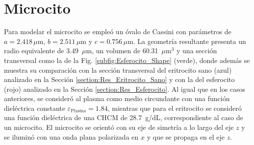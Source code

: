 
\section{Microcito}
\label{section:Res_Microcito}

Para modelar el microcito se empleó un óvalo de Cassini con parámetros de $a=2.418\,\mu\text{m}$, $b=2.511\,\mu\text{m}$ y $c=0.756\,\mu\text{m}$. La geometría resultante presenta un radio equivalente de 3.49~$\mu$m, un volumen de 60.31~$\mu\text{m}^3$ y una sección transversal como la de la Fig. \ref{subfig:Esferocito_Shape} (verde), donde además se muestra su comparación con la sección transversal del eritrocito sano (azul) analizado en la Sección \ref{section:Res_Eritrocito_Sano} y con la del esferocito (rojo) analizado en la Sección \ref{section:Res_Esferocito}. Al igual que en los casos anteriores, se consideró al plasma como medio circundante con una función dieléctrica constante $\varepsilon_{\text{Plasma}}=1.84$, mientras que para el eritrocito se consideró una función dieléctrica de una CHCM de 28.7~g/dL, correspondiente al caso de un microcito. El microcito se orientó con su eje de simetría a lo largo del eje $z$ y se iluminó con una onda plana polarizada en $x$ y que se propaga en el eje $z$.

